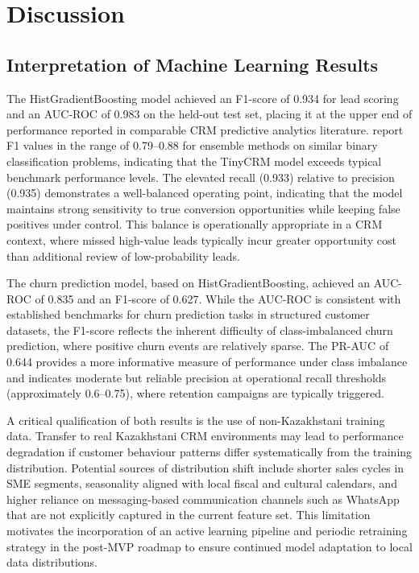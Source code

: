 \chapter{Discussion}
\label{chap:06}
\setlength{\parskip}{1em}

\section{Interpretation of Machine Learning Results}

The HistGradientBoosting model achieved an F1-score of 0.934 for lead 
scoring and an AUC-ROC of 0.983 on the held-out test set, placing it 
at the upper end of performance reported in comparable CRM predictive 
analytics literature. \citet{verbeke2012} report F1 values in the range 
of 0.79--0.88 for ensemble methods on similar binary classification 
problems, indicating that the TinyCRM model exceeds typical benchmark 
performance levels. The elevated recall (0.933) relative to 
precision (0.935) demonstrates a well-balanced operating point, 
indicating that the model maintains strong sensitivity to true conversion 
opportunities while keeping false positives under control. This balance is 
operationally appropriate in a CRM context, where missed high-value 
leads typically incur greater opportunity cost than additional review 
of low-probability leads.

The churn prediction model, based on HistGradientBoosting, 
achieved an AUC-ROC of 0.835 and an F1-score of 0.627. While the AUC-ROC 
is consistent with established benchmarks for churn prediction tasks 
in structured customer datasets, the F1-score reflects the inherent 
difficulty of class-imbalanced churn prediction, where positive churn 
events are relatively sparse. The PR-AUC of 0.644 provides a more 
informative measure of performance under class imbalance and indicates 
moderate but reliable precision at operational recall thresholds 
(approximately 0.6--0.75), where retention campaigns are typically triggered.

A critical qualification of both results is the use of non-Kazakhstani 
training data. Transfer to real Kazakhstani CRM environments may lead to 
performance degradation if customer behaviour patterns differ systematically 
from the training distribution. Potential sources of distribution shift 
include shorter sales cycles in SME segments, seasonality aligned with local 
fiscal and cultural calendars, and higher reliance on messaging-based 
communication channels such as WhatsApp that are not explicitly captured 
in the current feature set. This limitation motivates the incorporation of 
an active learning pipeline and periodic retraining strategy in the post-MVP 
roadmap to ensure continued model adaptation to local data distributions.
